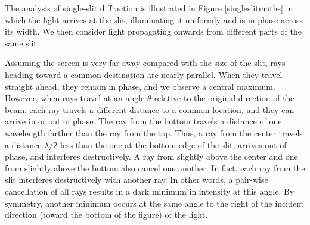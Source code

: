 The analysis of single-slit diffraction is illustrated in Figure \ref{singleslitmaths} in which the light arrives at the slit, illuminating it uniformly and is in phase across its width. We then consider light propagating onwards from different parts of the same slit. 

Assuming the screen is very far away compared with the size of the slit, rays heading toward a common destination are nearly parallel. When they travel straight ahead, they remain in phase, and we observe a central maximum. However, when rays travel at an angle $\theta$ relative to the original direction of the beam, each ray travels a different distance to a common location, and they can arrive in or out of phase. The ray from the bottom travels a distance of one wavelength farther than the ray from the top. Thus, a ray from the center travels a distance $\lambda/2$ less than the one at the bottom edge of the slit, arrives out of phase, and interferes destructively. A ray from slightly above the center and one from slightly above the bottom also cancel one another. In fact, each ray from the slit interferes destructively with another ray. In other words, a pair-wise cancellation of all rays results in a dark minimum in intensity at this angle. By symmetry, another minimum occurs at the same angle to the right of the incident direction (toward the bottom of the figure) of the light.

  
  
  
  
